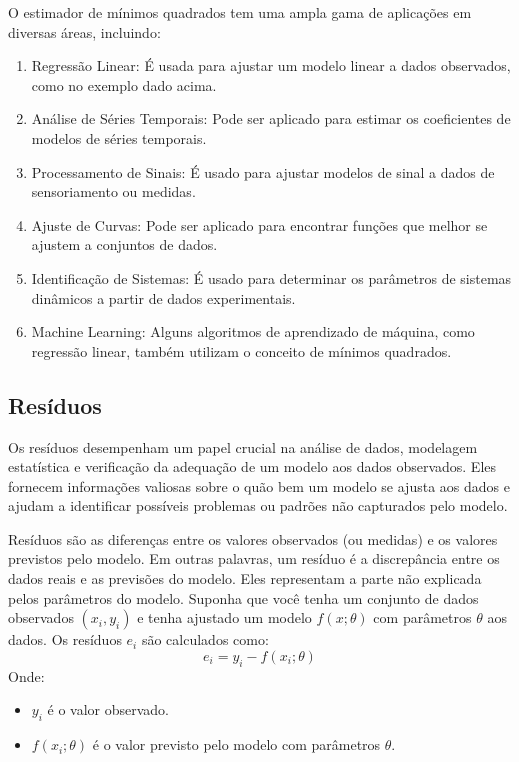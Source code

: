 \documentclass[a4paper,12pt]{article}
\begin{document}
O estimador de mínimos quadrados tem uma ampla gama de aplicações em diversas áreas, incluindo:
\begin{enumerate}
    \item Regressão Linear: É usada para ajustar um modelo linear a dados observados, como no exemplo dado acima.
    \item Análise de Séries Temporais: Pode ser aplicado para estimar os coeficientes de modelos de séries temporais.
    \item Processamento de Sinais: É usado para ajustar modelos de sinal a dados de sensoriamento ou medidas.
    \item Ajuste de Curvas: Pode ser aplicado para encontrar funções que melhor se ajustem a conjuntos de dados.
    \item Identificação de Sistemas: É usado para determinar os parâmetros de sistemas dinâmicos a partir de dados experimentais.
    \item Machine Learning: Alguns algoritmos de aprendizado de máquina, como regressão linear, também utilizam o conceito de mínimos quadrados.
\end{enumerate}

\subsection{Resíduos}

Os resíduos desempenham um papel crucial na análise de dados, modelagem estatística e verificação da adequação de um modelo aos dados observados. Eles fornecem informações valiosas sobre o quão bem um modelo se ajusta aos dados e ajudam a identificar possíveis problemas ou padrões não capturados pelo modelo.

Resíduos são as diferenças entre os valores observados (ou medidas) e os valores previstos pelo modelo. Em outras palavras, um resíduo é a discrepância entre os dados reais e as previsões do modelo. Eles representam a parte não explicada pelos parâmetros do modelo. Suponha que você tenha um conjunto de dados observados \((x_i, y_i)\) e tenha ajustado um modelo \(f(x; \theta)\) com parâmetros \(\theta\) aos dados. Os resíduos \(e_i\) são calculados como:
\begin{equation}
    e_i = y_i - f(x_i; \theta)\tag{2.8.1}
\end{equation}
Onde:
\begin{itemize}
    \item \(y_i\) é o valor observado.
    \item \(f(x_i; \theta)\) é o valor previsto pelo modelo com parâmetros \(\theta\).
\end{itemize}
\end{document}
